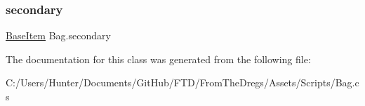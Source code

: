 \mbox{\label{class_bag_ad5d314d6b9a11127a8bdebc98f2a9cc0}} 
\subsubsection{\texorpdfstring{secondary}{secondary}}
{\footnotesize\ttfamily \mbox{\hyperlink{class_base_item}{Base\+Item}} Bag.\+secondary\hspace{0.3cm}{\ttfamily [get]}}



The documentation for this class was generated from the following file\+:\begin{DoxyCompactItemize}
\item 
C\+:/\+Users/\+Hunter/\+Documents/\+Git\+Hub/\+F\+T\+D/\+From\+The\+Dregs/\+Assets/\+Scripts/Bag.\+cs\end{DoxyCompactItemize}
